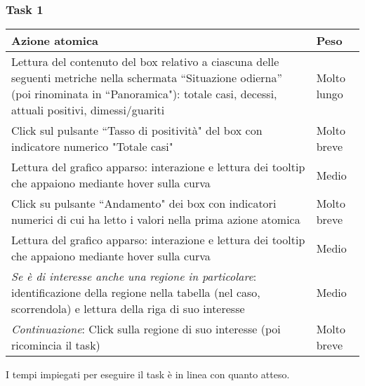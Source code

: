 \subsubsection{Task 1}
\label{sss:iaa-task-1}
{
\renewcommand{\arraystretch}{2}
\begin{longtable}[h]{| p{14cm} | p{2.5cm} |}
    \hline
    \textbf{Azione atomica} & \textbf{Peso} \\
    \hline
    \endhead
    Lettura del contenuto del box relativo a ciascuna delle seguenti metriche nella schermata ``Situazione odierna'' (poi rinominata in ``Panoramica"): totale casi, decessi, attuali positivi, dimessi/guariti & Molto lungo \\
    \hline
    Click sul pulsante ``Tasso di positività" del box con indicatore numerico "Totale casi" & Molto breve \\
    \hline
    Lettura del grafico apparso: interazione e lettura dei tooltip che appaiono mediante hover sulla curva & Medio \\
    \hline
    Click su pulsante ``Andamento" dei box con indicatori numerici di cui ha letto i valori nella prima azione atomica & Molto breve \\
    \hline
    Lettura del grafico apparso: interazione e lettura dei tooltip che appaiono mediante hover sulla curva & Medio \\
    \hline
    \textit{Se è di interesse anche una regione in particolare}: identificazione della regione nella tabella (nel caso, scorrendola) e lettura della riga di suo interesse & Medio \\
    \hline
    \textit{Continuazione}: Click sulla regione di suo interesse (poi ricomincia il task) & Molto breve \\
    \hline
\end{longtable}
}
I tempi impiegati per eseguire il task è in linea con quanto atteso.